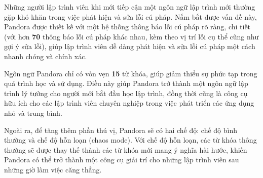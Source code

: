     Những người lập trình viên khi mới tiếp cận một ngôn ngữ lập trình mới thường gặp khó khăn trong việc phát hiện và sửa lỗi cú pháp. Nắm bắt được vấn đề này, Pandora được thiết kế với một hệ thống thông báo lỗi cú pháp rõ ràng, chi tiết (với hơn \textbf{70} thông báo lỗi cú pháp khác nhau, kèm theo vị trí lỗi cụ thể cũng như gợi ý sửa lỗi), giúp lập trình viên dễ dàng phát hiện và sửa lỗi cú pháp một cách nhanh chóng và chính xác.

    Ngôn ngữ Pandora chỉ có vỏn vẹn \textbf{15} từ khóa, giúp giảm thiểu sự phức tạp trong quá trình học và sử dụng. Điều này giúp Pandora trở thành một ngôn ngữ lập trình lý tưởng cho người mới bắt đầu học lập trình, đồng thời cũng là công cụ hữu ích cho các lập trình viên chuyên nghiệp trong việc phát triển các ứng dụng nhỏ và trung bình. 

    Ngoài ra, để tăng thêm phần thú vị, Pandora sẽ có hai chế độ: chế độ bình thường và chế độ hỗn loạn (chaos mode). Với chế độ hỗn loạn, các từ khóa thông thường sẽ được thay thế thành các từ khóa mới mang ý nghĩa hài hước, khiến Pandora có thể trở thành một công cụ giải trí cho những lập trình viên sau những giờ làm việc căng thẳng.
